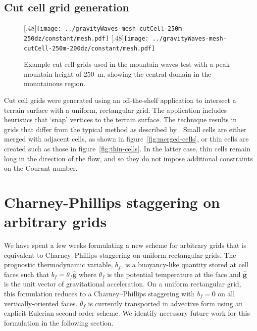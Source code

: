 \documentclass[a4paper]{article}
\begin{document}
\subsection*{Cut cell grid generation}
\begin{figure}
	\centering
	[.48\linewidth]{\texttt{[image: ../gravityWaves-mesh-cutCell-250m-250dz/constant/mesh.pdf]}}
	[.48\linewidth]{\texttt{[image: ../gravityWaves-mesh-cutCell-250m-200dz/constant/mesh.pdf]}}
%
	\caption{Example cut cell grids used in the mountain waves test with a peak mountain height of \SI{250}{\meter}, showing the central domain in the mountainous region.}
	\label{fig:cutCell-grids}
\end{figure}

Cut cell grids were generated using an off-the-shelf application to intersect a terrain surface with a uniform, rectangular grid.  The application includes heuristics that `snap' vertices to the terrain surface.
The technique results in grids that differ from the typical method as described by \citet{adcroft1997}.  Small cells are either merged with adjacent cells, as shown in figure~\ref{fig:merged-cells}, or thin cells are created such as those in figure~\ref{fig:thin-cells}.  In the latter case, thin cells remain long in the direction of the flow, and so they do not impose additional constraints on the Courant number.  

\section{Charney-Phillips staggering on arbitrary grids}
\label{sec:cp}
  We have spent a few weeks formulating a new scheme for arbitrary grids that is equivalent to Charney--Phillips staggering on uniform rectangular grids.  The prognostic thermodynamic variable, $b_f$, is a buoyancy-like quantity stored at cell faces such that $b_f = \theta_f \bm{\hat{g}}$ where $\theta_f$ is the potential temperature at the face and $\bm{\hat{g}}$ is the unit vector of gravitational acceleration.  On a uniform rectangular grid, this formulation reduces to a Charney--Phillips staggering with $b_f = 0$ on all vertically-oriented faces.  $\theta_f$ is currently transported in advective form using an explicit Eulerian second order scheme.  We identify necessary future work for this formulation in the following section.
\end{document}
